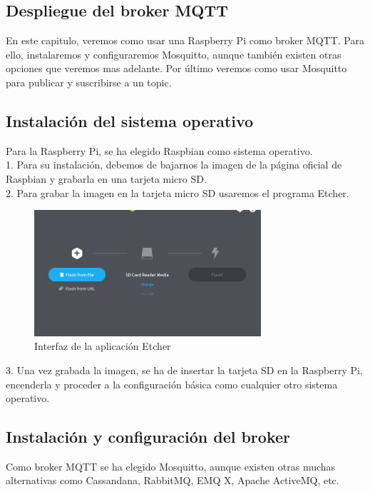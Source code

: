 \begin{titlepage}

\chapter{Despliegue del broker MQTT}
En este capitulo, veremos como usar una Raspberry Pi como broker MQTT. Para ello, instalaremos y configuraremos Mosquitto, aunque también existen otras opciones que veremos mas adelante. Por último veremos como usar Mosquitto para publicar y suscribirse a un topic.

\section{Instalación del sistema operativo}
Para la Raspberry Pi, se ha elegido Raspbian como sistema operativo. \\

1. Para su instalación, debemos de bajarnos la imagen de la página oficial de Raspbian\cite{ref26} y grabarla en una tarjeta micro SD. \\

2. Para grabar la imagen en la tarjeta micro SD usaremos el programa Etcher\cite{ref27}. \\
\begin{figure}[h!]
	\centering
	\includegraphics[width=0.75\textwidth]{imagenes/etcher.png}
	\caption{Interfaz de la aplicación Etcher}
\end{figure}

3. Una vez grabada la imagen, se ha de insertar la tarjeta SD en la Raspberry Pi, encenderla y proceder a la configuración básica como cualquier otro sistema operativo.\\

\section{Instalación y configuración del broker}
Como broker MQTT se ha elegido Mosquitto, aunque existen otras muchas alternativas\cite{ref28} como Cassandana, RabbitMQ, EMQ X, Apache ActiveMQ, etc.\\


\end{titlepage}
